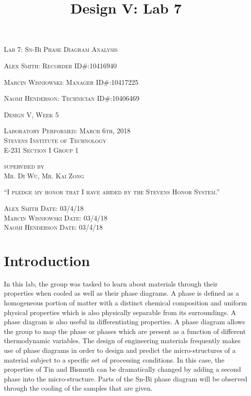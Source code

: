 \documentclass{article}
\begin{document}
\title{Design V: Lab 7}
\begin{titlepage}
    \centering
	{\scshape\LARGE Lab 7: Sn-Bi Phase Diagram Analysis\par}
	\vspace{1cm}
	{\scshape Alex Smith: Recorder \hfill ID\#:10416940 \par}
	{\scshape Marcin Wisniowski: Manager \hfill ID\#:10417225\par}
	{\scshape Naomi Henderson: Technician \hfill ID\#:10406469\par}
    \vfill
	{\scshape Design V, Week 5\par}
	\vspace{.5cm}
	{\scshape Laboratory Performed: March 6th, 2018\\Stevens Institute of Technology\\E-231 Section I Group 1\par}
	\vspace{.5cm}
	{\scshape supervised by\\Mr. Di Wu, Mr. Kai Zong \par}
    \vfill
	{\scshape“I pledge my honor that I have abided by the Stevens Honor System.”\par}
	\vspace{.5cm}
	{\scshape Alex Smith \hfill Date: 03/4/18\\Marcin Wisniowski \hfill Date: 03/4/18\\ Naomi Henderson \hfill Date: 03/4/18\\}
	\vspace{3cm}
\end{titlepage}

\section{Introduction}
In this lab, the group was tasked to learn about materials through their properties when cooled as well as their phase diagrams. A phase is defined as a homogeneous portion of matter with a distinct chemical composition and uniform physical properties which is also physically separable from its surroundings. A phase diagram is also useful in differentiating properties. A phase diagram allows the group to map the phase or phases which are present as a function of different thermodynamic variables. The design of engineering materials frequently makes use of phase diagrams in order to design and predict the micro-structures of a material subject to a specific set of processing conditions. In this case, the properties of Tin and Bismuth can be dramatically changed by adding a second phase into the micro-structure. Parts of the Sn-Bi phase diagram will be observed through the cooling of the samples that are given. 
\end{document}
